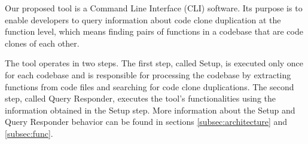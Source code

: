 \en

Our proposed tool is a Command Line Interface (CLI) software. Its purpose is to enable developers to query 
information about code clone duplication at the function level, which means finding pairs of functions in a codebase 
that are code clones of each other. 

The tool operates in two steps. The first step, called Setup, is executed only 
once for each codebase and is responsible for processing the codebase by extracting functions from code files and 
searching for code clone duplications. The second step, called Query Responder, executes the tool's functionalities 
using the information obtained in the Setup step. More information about the Setup and Query Responder behavior can 
be found in sections \ref{subsec:architecture}  and \ref{subsec:func}. 
